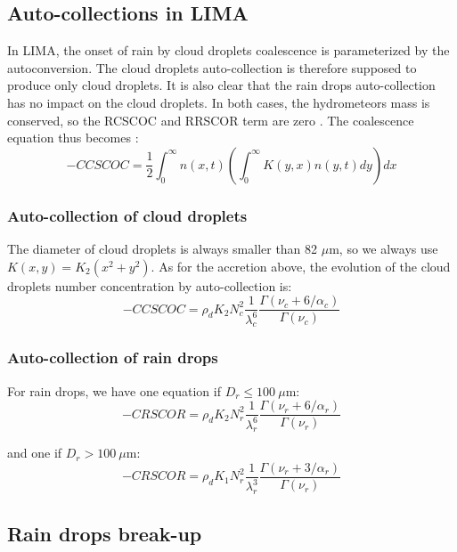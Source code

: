 {\subsection{Auto-collections in LIMA}

In LIMA, the onset of rain by cloud droplets coalescence is parameterized by the autoconversion. The cloud droplets auto-collection is therefore supposed to produce only cloud droplets. It is also clear that the rain drops auto-collection has no impact on the cloud droplets. In both cases, the hydrometeors mass is conserved, so the RCSCOC and RRSCOR term are zero \citep[see the demonstration in appendix A of][]{Cohard2000c2r2}. The coalescence equation thus becomes \citep[appendix A of][]{Cohard2000c2r2}:
\begin{equation}
 -CCSCOC = \frac{1}{2} \int_0^\infty n(x,t) \left( \int_0^\infty K(y,x) n(y,t) dy \right) dx
\end{equation}

\subsubsection{Auto-collection of cloud droplets}

The diameter of cloud droplets is always smaller than 82 $\mu$m, so we always use $K(x,y) = K_2 (x^2 + y^2)$. As for the accretion above, the evolution of the cloud droplets number concentration by auto-collection is:
\begin{equation}
 -CCSCOC = \rho_d K_2 N_c^2 \frac{1}{\lambda_c^6} \frac{\Gamma(\nu_c+6/\alpha_c)}{\Gamma(\nu_c)}
\end{equation}

\subsubsection{Auto-collection of rain drops}

For rain drops, we have one equation if $D_r \leq 100~\mu$m:
\begin{equation}
 -CRSCOR = \rho_d K_2 N_r^2 \frac{1}{\lambda_r^6} \frac{\Gamma(\nu_r+6/\alpha_r)}{\Gamma(\nu_r)}
\end{equation}

and one if $D_r > 100~\mu$m:
\begin{equation}
 -CRSCOR = \rho_d K_1 N_r^2 \frac{1}{\lambda_r^3} \frac{\Gamma(\nu_r+3/\alpha_r)}{\Gamma(\nu_r)}
\end{equation}

\subsection{Rain drops break-up}

}
